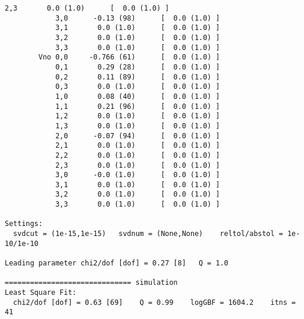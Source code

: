 \documentclass[letterpaper,10pt,english]{sphinxmanual}
\begin{document}
\begin{itemize}
\begin{Verbatim}[commandchars=\\\{\}]
            2,3       0.0 (1.0)      [  0.0 (1.0) ]  
            3,0      -0.13 (98)      [  0.0 (1.0) ]  
            3,1       0.0 (1.0)      [  0.0 (1.0) ]  
            3,2       0.0 (1.0)      [  0.0 (1.0) ]  
            3,3       0.0 (1.0)      [  0.0 (1.0) ]  
        Vno 0,0     -0.766 (61)      [  0.0 (1.0) ]  
            0,1       0.29 (28)      [  0.0 (1.0) ]  
            0,2       0.11 (89)      [  0.0 (1.0) ]  
            0,3       0.0 (1.0)      [  0.0 (1.0) ]  
            1,0       0.08 (40)      [  0.0 (1.0) ]  
            1,1       0.21 (96)      [  0.0 (1.0) ]  
            1,2       0.0 (1.0)      [  0.0 (1.0) ]  
            1,3       0.0 (1.0)      [  0.0 (1.0) ]  
            2,0      -0.07 (94)      [  0.0 (1.0) ]  
            2,1       0.0 (1.0)      [  0.0 (1.0) ]  
            2,2       0.0 (1.0)      [  0.0 (1.0) ]  
            2,3       0.0 (1.0)      [  0.0 (1.0) ]  
            3,0      -0.0 (1.0)      [  0.0 (1.0) ]  
            3,1       0.0 (1.0)      [  0.0 (1.0) ]  
            3,2       0.0 (1.0)      [  0.0 (1.0) ]  
            3,3       0.0 (1.0)      [  0.0 (1.0) ]  

Settings:
  svdcut = (1e-15,1e-15)   svdnum = (None,None)    reltol/abstol = 1e-10/1e-10

Leading parameter chi2/dof [dof] = 0.27 [8]   Q = 1.0

============================== simulation
Least Square Fit:
  chi2/dof [dof] = 0.63 [69]    Q = 0.99    logGBF = 1604.2    itns = 41


\end{Verbatim}
\end{itemize}
\end{document}
